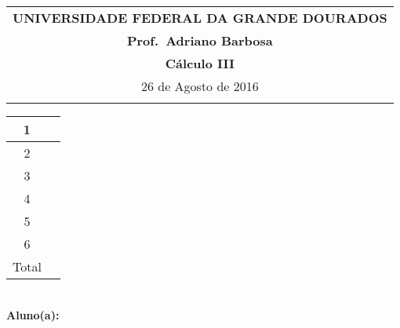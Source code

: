 \documentclass[a4paper,5pt]{amsbook}
\begin{document}
\thispagestyle{empty}
\begin{minipage}[b]{0.45\linewidth}
\begin{tabular}{c}
\toprule{}
{{\bf UNIVERSIDADE FEDERAL DA GRANDE DOURADOS}}\\
{{\bf Prof.\ Adriano Barbosa}}\\



{{\bf C\'alculo III}}\\

\midrule{}
\hspace{8cm}26 de Agosto de 2016  \\
\bottomrule{}
\end{tabular}
%
\end{minipage} \hfill
\begin{minipage}[b]{0.58\linewidth}
\begin{flushright}
\def\arraystretch{1.2}
\begin{tabular}{|c|c|}
\hline\hline
1 & \hspace{1.2cm} \\
\hline
2& \\
\hline
3& \\
\hline
4&  \\
\hline
5&  \\
\hline
6&  \\
\hline
{\small Total}&  \\
\hline\hline
\end{tabular}
\end{flushright}
\end{minipage} \hfill
\vspace{0.3cm}\\
{\bf Aluno(a):}\dotfill{} \\
\end{document}
